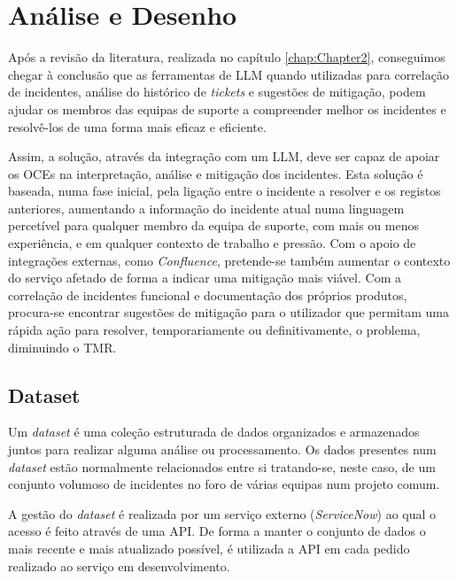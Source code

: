 
\chapter{Análise e Desenho} %
\label{chap:Chapter4} %

	Após a revisão da literatura, realizada no capítulo \ref{chap:Chapter2}, conseguimos chegar à conclusão que as ferramentas de \gls{LLM} quando utilizadas para correlação de incidentes, análise do histórico de \textit{tickets} e sugestões de mitigação, podem ajudar os membros das equipas de suporte a compreender melhor os incidentes e resolvê-los de uma forma mais eficaz e eficiente.
	
	Assim, a solução, através da integração com um \gls{LLM}, deve ser capaz de apoiar os \gls{OCEs} na interpretação, análise e mitigação dos incidentes. Esta solução é baseada, numa fase inicial, pela ligação entre o incidente a resolver e os registos anteriores, aumentando a informação do incidente atual numa linguagem percetível para qualquer membro da equipa de suporte, com mais ou menos experiência, e em qualquer contexto de trabalho e pressão. Com o apoio de integrações externas, como \textit{Confluence}, pretende-se também aumentar o contexto do serviço afetado de forma a indicar uma mitigação mais viável. Com a correlação de incidentes funcional e documentação dos próprios produtos, procura-se encontrar sugestões de mitigação para o utilizador que permitam uma rápida ação para resolver, temporariamente ou definitivamente, o problema, diminuindo o \gls{TMR}.

\section{Dataset}
	
	Um \textit{dataset} é uma coleção estruturada de dados organizados e armazenados juntos para realizar alguma análise ou processamento. Os dados presentes num \textit{dataset} estão normalmente relacionados entre si tratando-se, neste caso, de um conjunto volumoso de incidentes no foro de várias equipas num projeto comum.
	
	A gestão do \textit{dataset} é realizada por um serviço externo (\textit{ServiceNow}) ao qual o acesso é feito através de uma \gls{API}. De forma a manter o conjunto de dados o mais recente e mais atualizado possível, é utilizada a API em cada pedido realizado ao serviço em desenvolvimento.

